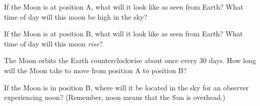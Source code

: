 \documentclass[11pt]{article}
\begin{document}
\vspace{4in}
\newpage
If the Moon is at position A, what will it look like as seen from Earth? What time of day will this moon be high in the sky?

\vspace{1in}

If the Moon is at position B, what will it look like as seen from Earth? What time of day will this moon {\it rise}?

\vspace{1in}

The Moon orbits the Earth counterclockwise about once every 30 days. 
How long will the Moon take to move from position A to position B?

\vspace{1in}

If the Moon is in position B, where will it be located in the sky for an observer experiencing noon? (Remember, noon means that 
the Sun is overhead.)
\end{document}
